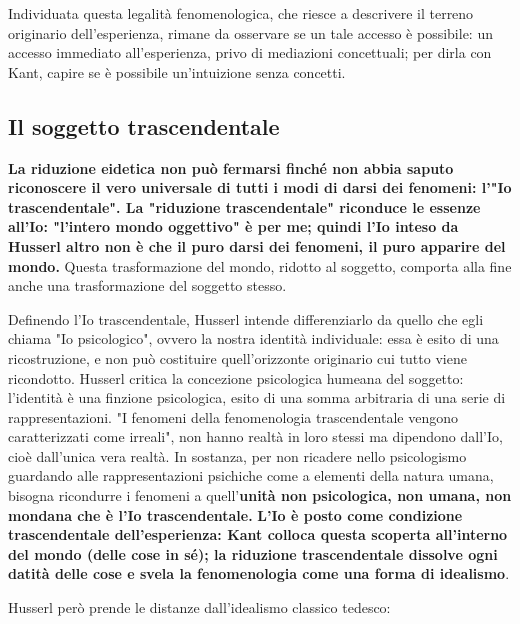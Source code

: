 Individuata questa legalità fenomenologica, che
riesce a descrivere il terreno originario dell'esperienza,
rimane da osservare se un tale accesso è possibile:
un accesso immediato all'esperienza, privo di mediazioni concettuali; per dirla con Kant, capire se è possibile un'intuizione
senza concetti.

\subsection{Il soggetto trascendentale}

\textbf{La riduzione eidetica non può fermarsi finché non abbia
saputo riconoscere il vero universale di tutti i modi di
darsi dei fenomeni: l'"Io trascendentale".
La "riduzione trascendentale" riconduce le essenze
all'Io: "l'intero mondo oggettivo" è per me; quindi l'Io inteso da Husserl altro non è che il puro darsi dei fenomeni, il puro apparire del mondo.}
Questa trasformazione del mondo, ridotto al
soggetto, comporta alla fine anche una
trasformazione del soggetto stesso.

Definendo l'Io trascendentale, Husserl intende
differenziarlo da quello che egli chiama
"Io psicologico", ovvero la nostra identità
individuale: essa è esito di una ricostruzione, e non
può costituire quell'orizzonte originario cui tutto
viene ricondotto. Husserl critica la concezione psicologica
humeana del soggetto: l'identità è una finzione
psicologica, esito di una somma arbitraria di una
serie di rappresentazioni.
"I fenomeni della fenomenologia trascendentale vengono
caratterizzati come irreali", non hanno realtà in
loro stessi ma dipendono dall'Io, cioè dall'unica
vera realtà.
In sostanza, per non ricadere nello psicologismo guardando alle rappresentazioni psichiche come a elementi della
natura umana, bisogna ricondurre i fenomeni a
quell'\textbf{unità non psicologica, non umana,
non mondana che è l'Io trascendentale.}
\textbf{L'Io  è posto come condizione trascendentale
dell'esperienza: Kant colloca questa scoperta
all'interno del mondo (delle cose in sé); la
riduzione trascendentale dissolve ogni datità
delle cose e svela la fenomenologia come una
forma di idealismo}.

Husserl però prende le distanze dall'idealismo classico tedesco:

